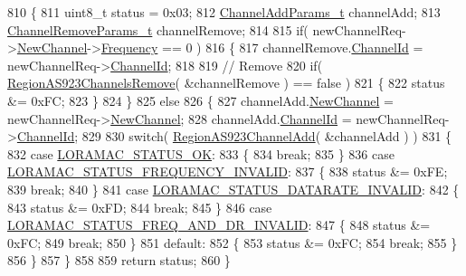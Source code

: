 \begin{DoxyCode}
810 \{
811     uint8\_t status = 0x03;
812     \mbox{\hyperlink{structs_channel_add_params}{ChannelAddParams\_t}} channelAdd;
813     \mbox{\hyperlink{structs_channel_remove_params}{ChannelRemoveParams\_t}} channelRemove;
814 
815     \textcolor{keywordflow}{if}( newChannelReq->\mbox{\hyperlink{structs_new_channel_req_params_afc31493a105479490228fd896b20b45c}{NewChannel}}->\mbox{\hyperlink{structs_channel_params_ade3d190636488dad9a89b19446b7acf1}{Frequency}} == 0 )
816     \{
817         channelRemove.\mbox{\hyperlink{structs_channel_remove_params_ae23f953dc29c360e56a3c856404a3276}{ChannelId}} = newChannelReq->\mbox{\hyperlink{structs_new_channel_req_params_ab072d8ed1ab01d956d5b86a9d0185c3f}{ChannelId}};
818 
819         \textcolor{comment}{// Remove}
820         \textcolor{keywordflow}{if}( \mbox{\hyperlink{group___r_e_g_i_o_n_a_s923_ga288bc8bbec286314166d13033979678f}{RegionAS923ChannelsRemove}}( &channelRemove ) == \textcolor{keyword}{false} )
821         \{
822             status &= 0xFC;
823         \}
824     \}
825     \textcolor{keywordflow}{else}
826     \{
827         channelAdd.\mbox{\hyperlink{structs_channel_add_params_afc31493a105479490228fd896b20b45c}{NewChannel}} = newChannelReq->\mbox{\hyperlink{structs_new_channel_req_params_afc31493a105479490228fd896b20b45c}{NewChannel}};
828         channelAdd.\mbox{\hyperlink{structs_channel_add_params_ae23f953dc29c360e56a3c856404a3276}{ChannelId}} = newChannelReq->\mbox{\hyperlink{structs_new_channel_req_params_ab072d8ed1ab01d956d5b86a9d0185c3f}{ChannelId}};
829 
830         \textcolor{keywordflow}{switch}( \mbox{\hyperlink{group___r_e_g_i_o_n_a_s923_ga7477b7737c48e88f1d82a7ef70eb7b56}{RegionAS923ChannelAdd}}( &channelAdd ) )
831         \{
832             \textcolor{keywordflow}{case} \mbox{\hyperlink{group___l_o_r_a_m_a_c_gga1d18f26b344040b3ec5c3db662919661a03db5fca052313edb3823c014b653a74}{LORAMAC\_STATUS\_OK}}:
833             \{
834                 \textcolor{keywordflow}{break};
835             \}
836             \textcolor{keywordflow}{case} \mbox{\hyperlink{group___l_o_r_a_m_a_c_gga1d18f26b344040b3ec5c3db662919661ae3ea7b89796aed5a320013d9743b2955}{LORAMAC\_STATUS\_FREQUENCY\_INVALID}}:
837             \{
838                 status &= 0xFE;
839                 \textcolor{keywordflow}{break};
840             \}
841             \textcolor{keywordflow}{case} \mbox{\hyperlink{group___l_o_r_a_m_a_c_gga1d18f26b344040b3ec5c3db662919661aa910e51ef7a7cf64c27dd3ffe5eb9d38}{LORAMAC\_STATUS\_DATARATE\_INVALID}}:
842             \{
843                 status &= 0xFD;
844                 \textcolor{keywordflow}{break};
845             \}
846             \textcolor{keywordflow}{case} \mbox{\hyperlink{group___l_o_r_a_m_a_c_gga1d18f26b344040b3ec5c3db662919661a163a1a739baee13607068af42f2e9d30}{LORAMAC\_STATUS\_FREQ\_AND\_DR\_INVALID}}:
847             \{
848                 status &= 0xFC;
849                 \textcolor{keywordflow}{break};
850             \}
851             \textcolor{keywordflow}{default}:
852             \{
853                 status &= 0xFC;
854                 \textcolor{keywordflow}{break};
855             \}
856         \}
857     \}
858 
859     \textcolor{keywordflow}{return} status;
860 \}
\end{DoxyCode}
